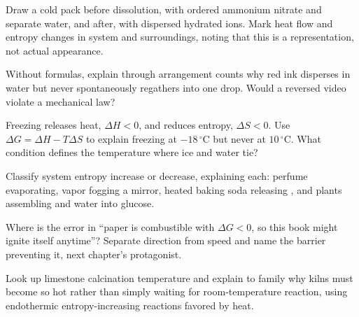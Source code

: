 \begin{sikaoti}
\item Draw a cold pack before dissolution, with ordered ammonium nitrate and separate water, and after, with dispersed hydrated ions. Mark heat flow and entropy changes in system and surroundings, noting that this is a representation, not actual appearance.
\item Without formulas, explain through arrangement counts why red ink disperses in water but never spontaneously regathers into one drop. Would a reversed video violate a mechanical law?
\item Freezing releases heat, $\Delta H<0$, and reduces entropy, $\Delta S<0$. Use $\Delta G=\Delta H-T\Delta S$ to explain freezing at $-18\,^{\circ}\mathrm{C}$ but never at $10\,^{\circ}\mathrm{C}$. What condition defines the temperature where ice and water tie?
\item Classify system entropy increase or decrease, explaining each: perfume evaporating, vapor fogging a mirror, heated baking soda releasing , and plants assembling  and water into glucose.
\item Where is the error in ``paper is combustible with $\Delta G<0$, so this book might ignite itself anytime''? Separate direction from speed and name the barrier preventing it, next chapter's protagonist.
\item Look up limestone calcination temperature and explain to family why kilns must become so hot rather than simply waiting for room-temperature reaction, using endothermic entropy-increasing reactions favored by heat.
\end{sikaoti}
